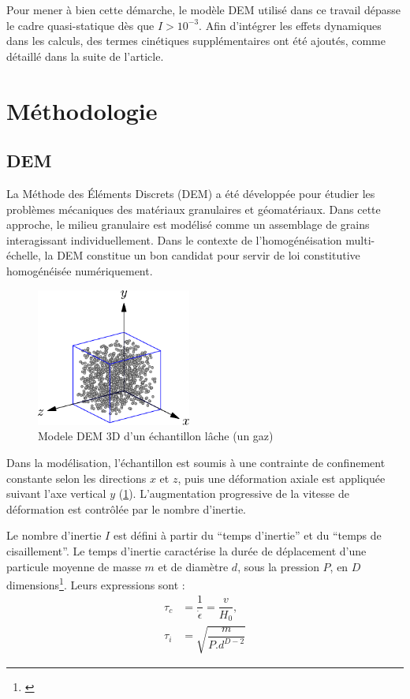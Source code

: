 \documentclass[5p,authoryear,square]{elsarticle}
\begin{document}
Pour mener à bien cette démarche, le modèle DEM utilisé dans ce travail dépasse le cadre quasi-statique dès que $I > 10^{-3}$. Afin d’intégrer les effets dynamiques dans les calculs, des termes cinétiques supplémentaires ont été ajoutés, comme détaillé dans la suite de l’article.
\section{Méthodologie}\label{methode}

\subsection{DEM}\label{dem}

La Méthode des Éléments Discrets (DEM) a été développée pour étudier les problèmes mécaniques des matériaux granulaires et géomatériaux.
Dans cette approche, le milieu granulaire est modélisé comme un assemblage de grains interagissant individuellement.
Dans le contexte de l'homogénéisation multi-échelle, la DEM constitue un bon candidat pour servir de loi constitutive homogénéisée numériquement.

\begin{figure}[h] \centering
	\includegraphics[width=2in]{figures/modele.pdf}
	\caption[]{Modele DEM 3D d'un échantillon lâche (un gaz)}
	\label{echantillon} 
\end{figure}


Dans la modélisation, l’échantillon est soumis à une contrainte de confinement constante selon les directions $x$ et $z$, puis une déformation axiale est appliquée suivant l’axe vertical $y$ (\cref{echantillon}).
L’augmentation progressive de la vitesse de déformation est contrôlée par le nombre d'inertie.


    Le nombre d'inertie $I$ est défini à partir du ``temps d'inertie'' et du ``temps de cisaillement''.
    Le temps d'inertie caractérise la durée de déplacement d'une particule moyenne de masse $m$ et de diamètre $d$, sous la pression $P$, en $D$ dimensions\footnote{\citep{combe2023demlecture}}. Leurs expressions sont :
    \begin{align}
        	\tau_c &= \dfrac{1}{\dot{\epsilon}} = \dfrac{v}{H_0}, \\
        	\tau_i &= \sqrt{\dfrac{m}{P.d^{D-2}}}
    \end{align}
\end{document}
